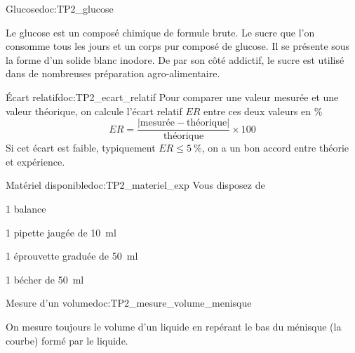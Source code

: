 \begin{doc}{Glucose}{doc:TP2_glucose}
  \begin{wrapfigure}{r}{0.3\linewidth}
    \vspace{-30pt}
    \centering
  \end{wrapfigure}
  
  Le glucose est un composé chimique de formule brute.
  Le sucre que l'on consomme tous les jours et un corps pur composé de glucose.
  Il se présente sous la forme d'un solide blanc inodore.
  De par son côté addictif, le sucre est utilisé dans de nombreuses préparation agro-alimentaire.
\end{doc}


\begin{doc}{Écart relatif}{doc:TP2_ecart_relatif}
  Pour comparer une valeur mesurée et une valeur théorique, on calcule l'écart relatif $ER$ entre ces deux valeurs en \unit{\percent}
  \begin{equation*}
    ER = \dfrac{|\text{mesurée} - \text{théorique}|}{\text{théorique}} \times 100
  \end{equation*}
  Si cet écart est faible, typiquement $ER \leq \qty{5}{\percent}$, on a un bon accord entre théorie et expérience.
\end{doc}

\begin{multicols}{2}
  \begin{doc}{Matériel disponible}{doc:TP2_materiel_exp}
    Vous disposez de
    \begin{listePoints}
      \item 1 balance
      \item 1 pipette jaugée de \qty{10}{\ml}
      \item 1 éprouvette graduée de \qty{50}{\ml}
      \item 1 bécher de \qty{50}{\ml}
    \end{listePoints}
  \end{doc}
    
  \begin{doc}{Mesure d'un volume}{doc:TP2_mesure_volume_menisque}
    \begin{wrapfigure}{l}{0.48\linewidth}  
      \centering
      \vspace*{-18pt}
    \end{wrapfigure}
    On mesure toujours le volume d'un liquide en repérant le bas du ménisque (la courbe) formé par le liquide.
  \end{doc}
\end{multicols}

